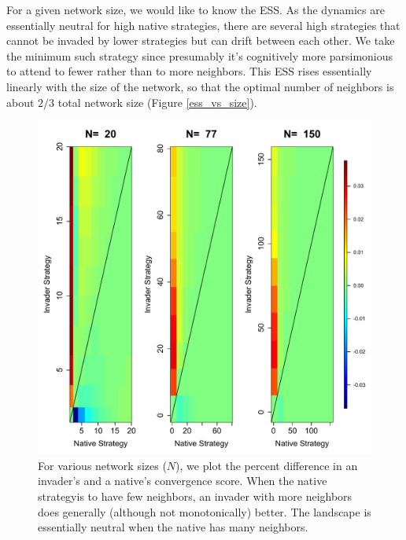 \documentclass{article}
\begin{document}
For a given network size, we would like to know the ESS.  As the dynamics are essentially neutral for high native strategies, there are several high strategies that cannot be invaded by lower strategies but can drift between each other.  We take the minimum such strategy since presumably it's cognitively more parsimonious to attend to fewer rather than to more neighbors.  This ESS rises essentially linearly with the size of the network, so that the optimal number of neighbors is about $2/3$ total network size (Figure \ref{ess_vs_size}).

\begin{figure}
 \includegraphics[width=\textwidth]{ess_plot.pdf}
\caption{For various network sizes ($N$), we plot the percent difference in an invader's and a native's convergence score.  When the native strategyis to have few neighbors, an invader with more neighbors does generally (although not monotonically) better.  The landscape is essentially neutral when the native has many neighbors.}
\label{ess_grid}
\end{figure}
\end{document}
